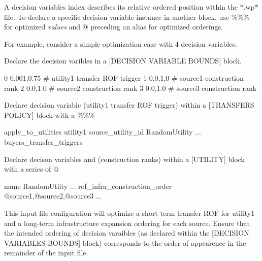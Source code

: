 A decision variable\textquotesingle{}s {\ttfamily index} describes its relative ordered position within the $\ast$.wp$\ast$ file. To declare a specific decision variable instance in another block, use {\ttfamily \%\%\%} for optimized {\itshape values} and {\ttfamily @} preceding an alias for optimized orderings. ~\newline


For example, consider a simple optimization case with 4 decision variables.~\newline



\begin{DoxyEnumerate}
\item Declare the decision varibles in a \mbox{[}D\+E\+C\+I\+S\+I\+ON V\+A\+R\+I\+A\+B\+LE B\+O\+U\+N\+DS\mbox{]} block. 
\begin{DoxyCode}
0 0.001,0.75    # utility1 transfer ROF trigger
1 0.0,1,0       # source1 construction rank
2 0.0,1.0       # source2 construction rank
3 0.0,1.0       # source3 construction rank
\end{DoxyCode}

\item Declare decision variable {} (utility1 transfer R\+OF trigger) within a \mbox{[}T\+R\+A\+N\+S\+F\+E\+RS P\+O\+L\+I\+CY\mbox{]} block with a {\ttfamily \%\%\%} 
\begin{DoxyCode}
apply\_to\_utilities utility1
source\_utility\_id RandomUtility
...
buyers\_transfer\_triggers %
\end{DoxyCode}

\item Declare decison variables {} {} and {} (construction ranks) within a \mbox{[}U\+T\+I\+L\+I\+TY\mbox{]} block with a series of {\ttfamily @} 
\begin{DoxyCode}
[UTILITY]
name RandomUtlity
...
rof\_infra\_construction\_order @source1,@source2,@source3
...
\end{DoxyCode}

\end{DoxyEnumerate}

This input file configuration will optimize a short-\/term transfer R\+OF for {\ttfamily utility1} and a long-\/term infrastructure expansion ordering for each {\ttfamily source}. Ensure that the intended ordering of decision varaibles (as declared within the \mbox{[}D\+E\+C\+I\+S\+I\+ON V\+A\+R\+I\+A\+B\+L\+ES B\+O\+U\+N\+DS\mbox{]} block) corresponds to the order of appearence in the remainder of the input file. ~\newline


